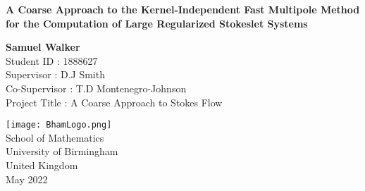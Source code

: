\begin{titlepage}
    \begin{center}
        \vspace*{1cm}

        \LARGE
        \textbf{A Coarse Approach to the Kernel-Independent Fast Multipole Method for the Computation of Large Regularized Stokeslet Systems}

        \normalsize
        
        \vspace{1.5cm}
        
        \textbf{Samuel Walker}\\
        Student ID : 1888627 \\
        Supervisor : D.J Smith \\
        Co-Supervisor : T.D Montenegro-Johnson\\
        Project Title : A Coarse Approach to Stokes Flow
        
        \vfill
        
        \vspace{0.8cm}
        
        \texttt{[image: BhamLogo.png]}\\
        
        \normalsize
        School of Mathematics\\
        University of Birmingham\\
        United Kingdom\\
        May 2022
            
    \end{center}
\end{titlepage}



